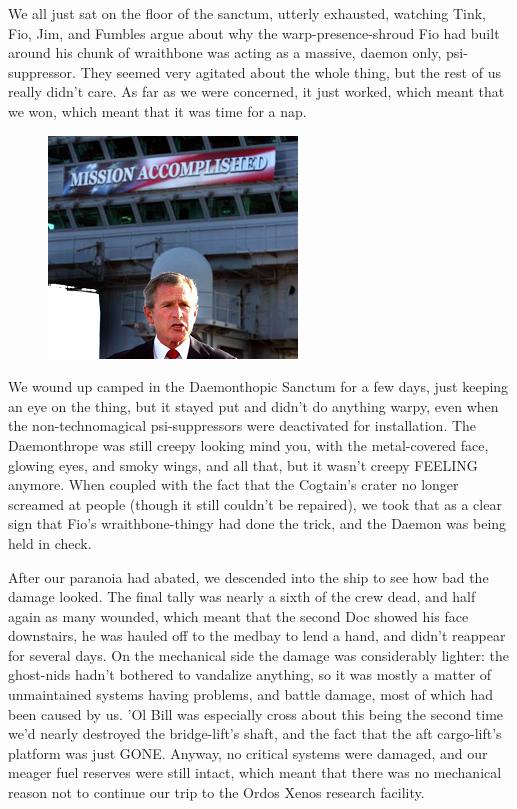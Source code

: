 We all just sat on the floor of the sanctum, utterly exhausted, watching Tink, Fio, Jim, and Fumbles argue about why the warp-presence-shroud Fio had built around his chunk of wraithbone was acting as a massive, daemon only, psi-suppressor. 
They seemed very agitated about the whole thing, but the rest of us really didn't care. 
As far as we were concerned, it just worked, which meant that we won, which meant that it was time for a nap.

\begin{figure}
	\begin{center}
		\includegraphics[width=\figwidth]{pics/15/72.png}
	\end{center}
\end{figure}
We wound up camped in the Daemonthopic Sanctum for a few days, just keeping an eye on the thing, but it stayed put and didn't do anything warpy, even when the non-technomagical psi-suppressors were deactivated for installation. 
The Daemonthrope was still creepy looking mind you, with the metal-covered face, glowing eyes, and smoky wings, and all that, but it wasn't creepy FEELING anymore. 
When coupled with the fact that the Cogtain's crater no longer screamed at people (though it still couldn't be repaired), we took that as a clear sign that Fio's wraithbone-thingy had done the trick, and the Daemon was being held in check.

After our paranoia had abated, we descended into the ship to see how bad the damage looked. 
The final tally was nearly a sixth of the crew dead, and half again as many wounded, which meant that the second Doc showed his face downstairs, he was hauled off to the medbay to lend a hand, and didn't reappear for several days. 
On the mechanical side the damage was considerably lighter: 
the ghost-nids hadn't bothered to vandalize anything, so it was mostly a matter of unmaintained systems having problems, and battle damage, most of which had been caused by us. 
'Ol Bill was especially cross about this being the second time we'd nearly destroyed the bridge-lift's shaft, and the fact that the aft cargo-lift's platform was just GONE. 
Anyway, no critical systems were damaged, and our meager fuel reserves were still intact, which meant that there was no mechanical reason not to continue our trip to the Ordos Xenos research facility.

